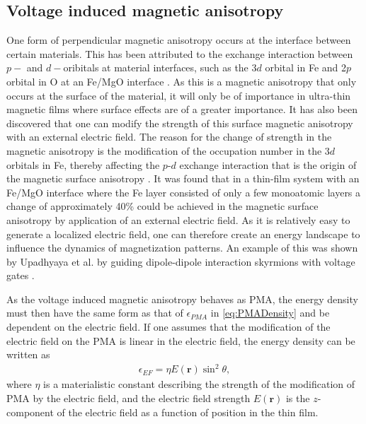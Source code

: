 \subsection{Voltage induced magnetic anisotropy} \label{sec:VIMA}
One form of perpendicular magnetic anisotropy occurs at the interface between certain materials. This has been attributed to the exchange interaction between $p-$ and $d-$oribitals at material interfaces, such as the 3$d$ orbital in Fe and 2$p$ orbital in O at an Fe/MgO interface \cite{Matsukura2015}. As this is a magnetic anisotropy that only occurs at the surface of the material, it will only be of importance in ultra-thin magnetic films where surface effects are of a greater importance. It has also been discovered that one can modify the strength of this surface magnetic anisotropy with an external electric field. The reason for the change of strength in the magnetic anisotropy is the modification of the occupation number in the 3$d$ orbitals in Fe, thereby affecting the $p$-$d$ exchange interaction that is the origin of the magnetic surface anisotropy \cite{Maruyama2009}. It was found that in a thin-film system with an Fe/MgO interface where the Fe layer consisted of only a few monoatomic layers a change of approximately 40\% could be achieved in the magnetic surface anisotropy by application of an external electric field. As it is relatively easy to generate a localized electric field, one can therefore create an energy landscape to influence the dynamics of magnetization patterns. An example of this was shown by Upadhyaya et al. by guiding dipole-dipole interaction skyrmions with voltage gates \cite{Upadhyaya2015}.

As the voltage induced magnetic anisotropy behaves as PMA, the energy density must then have the same form as that of $\epsilon_{PMA}$ in \eqref{eq:PMADensity} and be dependent on the electric field. If one assumes that the modification of the electric field on the PMA is linear in the electric field, the energy density can be written as
\begin{align}
\epsilon_{EF} = \eta E(\mathbold{r}) \sin^2\theta,
\end{align}
where $\eta$ is a materialistic constant describing the strength of the modification of PMA by the electric field, and the electric field strength $E(\mathbold{r})$ is the $z$-component of the electric field as a function of position in the thin film. 

